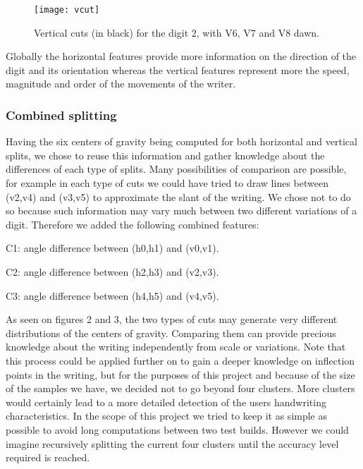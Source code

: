 \documentclass[a4paper]{article}
\begin{document}
{\begin{figure}[h!]
  \centering
    \texttt{[image: vcut]}
  \caption{Vertical cuts (in black) for the digit 2, with V6, V7 and V8 dawn.}
\end{figure}

Globally the horizontal features provide more information on the direction of the digit and its orientation whereas the vertical features represent more the speed, magnitude and order of the movements of the writer.

\subsubsection{Combined splitting}

Having the six centers of gravity being computed for both horizontal and vertical splits, we chose to reuse this information and gather knowledge about the differences of each type of splits. Many possibilities of comparison are possible, for example in each type of cuts we could have tried to draw lines between (v2,v4) and (v3,v5) to approximate the slant of the writing. We chose not to do so because such information may vary much between two different variations of a digit. Therefore we added the following combined features:

\begin{listCustom}
	\item C1: angle difference between (h0,h1) and (v0,v1).
	\item C2: angle difference between (h2,h3) and (v2,v3).
	\item C3: angle difference between (h4,h5) and (v4,v5).
\end{listCustom}

As seen on figures 2 and 3, the two types of cuts may generate very different distributions of the centers of gravity. Comparing them can provide precious knowledge about the writing independently from scale or variations. Note that this process could be applied further on to gain a deeper knowledge on inflection points in the writing, but for the purposes of this project and because of the size of the samples we have, we decided not to go beyond four clusters. More clusters would certainly lead to a more detailed detection of the users handwriting characteristics. In the scope of this project we tried to keep it as simple as possible to avoid long computations between two test builds. However we could imagine recursively splitting the current four clusters until the accuracy level required is reached.
\pagebreak

}
\end{document}
